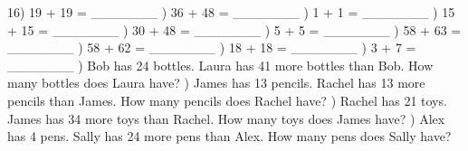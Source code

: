 \documentclass{article}%
\begin{document}
16) 19 + 19 = \_\_\_\_\_\_\_%
\newline%
\newline%
) 36 + 48 = \_\_\_\_\_\_\_%
\newline%
\newline%
) 1 + 1 = \_\_\_\_\_\_\_%
\newline%
\newline%
) 15 + 15 = \_\_\_\_\_\_\_%
\newline%
\newline%
) 30 + 48 = \_\_\_\_\_\_\_%
\newline%
\newline%
) 5 + 5 = \_\_\_\_\_\_\_%
\newline%
\newline%
) 58 + 63 = \_\_\_\_\_\_\_%
\newline%
\newline%
) 58 + 62 = \_\_\_\_\_\_\_%
\newline%
\newline%
) 18 + 18 = \_\_\_\_\_\_\_%
\newline%
\newline%
) 3 + 7 = \_\_\_\_\_\_\_%
\newline%
\newline%
) Bob has 24 bottles. Laura has 41 more bottles than Bob. How many bottles does Laura have?%
\newline%
\newline%
) James has 13 pencils. Rachel has 13 more pencils than James. How many pencils does Rachel have?%
\newline%
\newline%
) Rachel has 21 toys. James has 34 more toys than Rachel. How many toys does James have?%
\newline%
\newline%
) Alex has 4 pens. Sally has 24 more pens than Alex. How many pens does Sally have?%
\end{document}
